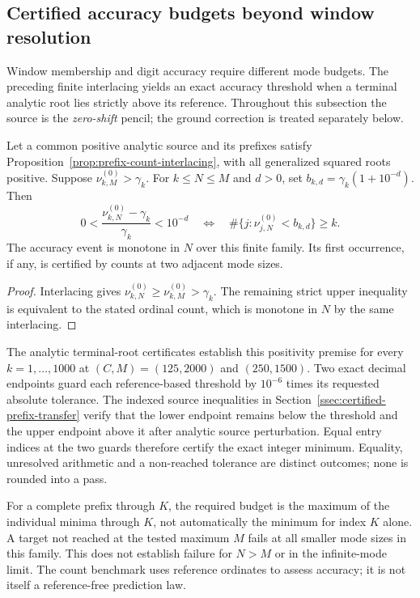\subsection{Certified accuracy budgets beyond window resolution}
\label{ssec:certified-accuracy-budget}

Window membership and digit accuracy require different mode budgets.
The preceding finite interlacing yields an exact accuracy threshold
when a terminal analytic root lies strictly above its reference.
Throughout this subsection the source is the \emph{zero-shift} pencil;
the ground correction is treated separately below.

\begin{proposition}
\label{prop:finite-accuracy-threshold}
Let a common positive analytic source and its prefixes satisfy
Proposition~\ref{prop:prefix-count-interlacing}, with all generalized
squared roots positive. Suppose
$\nu^{(0)}_{k,M}>\gamma_k$. For $k\le N\le M$ and $d>0$, set
$b_{k,d}=\gamma_k(1+10^{-d})$. Then
\[
 0<\frac{\nu^{(0)}_{k,N}-\gamma_k}{\gamma_k}<10^{-d}
 \quad\Longleftrightarrow\quad
 \#\{j:\nu^{(0)}_{j,N}<b_{k,d}\}\ge k.
\]
The accuracy event is monotone in $N$ over this finite family. Its first
occurrence, if any, is certified by counts at two adjacent mode sizes.
\end{proposition}
\begin{proof}
Interlacing gives $\nu^{(0)}_{k,N}\ge\nu^{(0)}_{k,M}>\gamma_k$.
The remaining strict upper inequality is equivalent to the stated
ordinal count, which is monotone in $N$ by the same interlacing.
\end{proof}

The analytic terminal-root certificates establish this positivity
premise for every $k=1,\ldots,1000$ at $(C,M)=(125,2000)$ and
$(250,1500)$. Two exact decimal endpoints guard each reference-based
threshold by $10^{-6}$ times its requested absolute tolerance. The
indexed source inequalities in Section~\ref{ssec:certified-prefix-transfer}
verify that the lower endpoint remains below the threshold and the
upper endpoint above it after analytic source perturbation. Equal
entry indices at the two guards therefore certify the exact integer
minimum. Equality, unresolved arithmetic and a non-reached tolerance
are distinct outcomes; none is rounded into a pass.



For a complete prefix through $K$, the required budget is the maximum
of the individual minima through $K$, not automatically the minimum
for index $K$ alone. A target not reached at the tested maximum $M$
fails at all smaller mode sizes in this family. This does not establish
failure for $N>M$ or in the infinite-mode limit. The count benchmark
uses reference ordinates to assess accuracy; it is not itself a
reference-free prediction law.

